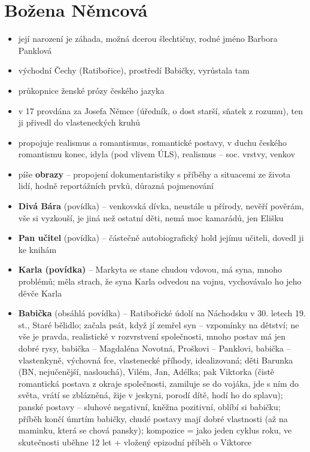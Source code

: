 \documentclass{article}
\begin{document}
\section{Božena Němcová}
\begin{itemize}
  \item její narození je záhada, možná dcerou šlechtičny, rodné jméno Barbora Panklová
  \item východní Čechy (Ratibořice), prostředí Babičky, vyrůstala tam
  \item průkopnice ženské prózy českého jazyka
  \item v 17 provdána za Josefa Němce (úředník, o dost starší, sňatek z rozumu), ten ji přivedl do vlasteneckých kruhů
  \item propojuje realismus a romantismus, romantické postavy, v duchu českého romantismu konec, idyla (pod vlivem ÚLS), realismus -- soc. vrstvy, venkov
  \item píše \textbf{obrazy} -- propojení dokumentaristiky s příběhy a situacemi ze života lidí, hodně reportážních prvků, důrazná pojmenování
  \item \textbf{Divá Bára} (povídka) -- venkovská dívka, neustále u přírody, nevěří pověrám, vše si vyzkouší, je jiná než ostatní děti, nemá moc kamarádů, jen Elišku
  \item \textbf{Pan učitel} (povídka) -- částečně autobiografický hold jejímu učiteli, dovedl ji ke knihám
  \item \textbf{Karla (povídka)} -- Markyta se stane chudou vdovou, má syna, mnoho problémů; měla strach, že syna Karla odvedou na vojnu, vychovávalo ho jeho děvče Karla
  \item \textbf{Babička} (obsáhlá povídka) -- Ratibořické údolí na Náchodsku v 30. letech 19. st., Staré bělidlo; začala psát, když jí zemřel syn -- vzpomínky na dětství; ne vše je pravda, realistické v rozvrstvení společnosti, mnoho postav má jen dobré rysy, babička – Magdaléna Novotná, Proškovi – Panklovi, babička -- vlastenkyně, výchovná fce, vlastenecké příhody, idealizovaná; děti Barunka (BN, nejučenější, naslouchá), Vilém, Jan, Adélka; pak Viktorka (čistě romantická postava z okraje společnosti, zamiluje se do vojáka, jde s ním do světa, vrátí se zblázněná, žije v jeskyni, porodí dítě, hodí ho do splavu); panské postavy -- sluhové negativní, kněžna pozitivní, oblíbí si babičku; příběh končí úmrtím babičky, chudé postavy mají dobré vlastnosti (až na maminku, která se chová pansky); kompozice = jako jeden cyklus roku, ve skutečnosti uběhne 12 let + vložený epizodní příběh o Viktorce
\end{itemize}
\end{document}
